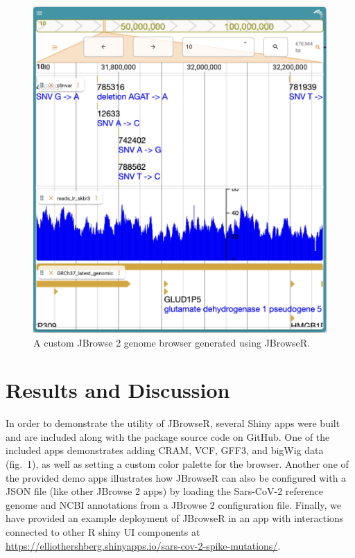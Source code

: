 \documentclass{bioinfo}
\begin{document}
\begin{figure}
\includegraphics[width=1\linewidth]{JBrowseR-paper-fig1} \caption{A custom JBrowse 2 genome browser generated using JBrowseR.}\label{fig:unnamed-chunk-1}
\end{figure}

\section{Results and Discussion}

In order to demonstrate the utility of JBrowseR, several Shiny apps were
built and are included along with the package source code on GitHub. One of
the included apps demonstrates adding CRAM, VCF, GFF3, and bigWig data
(fig.~1), as well as setting a custom color palette for the browser.
Another one of the provided demo apps illustrates how JBrowseR can also
be configured with a JSON file (like other JBrowse 2 apps) by    %
loading the Sars-CoV-2 reference genome and NCBI annotations from a
JBrowse 2 configuration file. Finally, we have provided an example
deployment of JBrowseR in an app with interactions connected to other R
shiny UI components at
\href{https://elliothershberg.shinyapps.io/sars-cov-2-spike-mutations/}{https://elliothershberg.shinyapps.io/sars-cov-2-spike-mutations/}.
\end{document}
